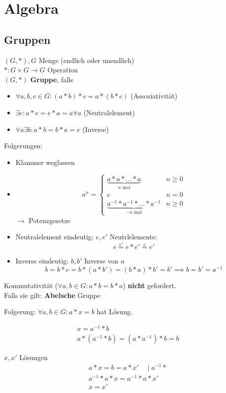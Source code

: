 \chapter{Algebra}
\section{Gruppen}
\clearpage
\begin{def*}[note = Gruppe , index = Gruppe]
	$(G,*) , G$ Menge (endlich oder unendlich) \\
	$* : G \times G \rightarrow G$ Operation \\
	$(G,*)$ \textbf{Gruppe}, falls
	\begin{itemize}
		\item $\forall a , b , c \in G : (a*b)*c = a*(b*c)$ (Assoziativität)
		\item $\exists e : a*e = e*a = a \forall a$ (Neutralelement)
		\item $\forall a \exists b : a*b = b*a = e$ (Inverse)
	\end{itemize}
	Folgerungen:
	\begin{itemize}
		\item Klammer weglassen
		\item \[ a^n = \begin{cases}
			\underbrace{a * a * \dots * a}_{n \text{ mal}}				&n \geq 0	\\
			e											&n = 0	\\
			\underbrace{a^{-1} * a^{-1} * \dots * a^{-1}}_{-n \text{ mal}}	&n \geq 0	
			\end{cases} \] $\rightarrow$ Potenzgesetze
		\item Neutralelement eindeutig: $e, e'$ Neutrlelemente: \[ e \overset{e'}{=} e * e' \overset{e}{=} e' \]
		\item Inverse eindeutig: $b, b'$ Inverse von $a$ \[ b = b*e = b*(a*b') = (b*a)*b' = b' \implies b = b' = a^{-1} \]
	\end{itemize}
\end{def*}
\begin{bem}
	Kommutativität ($\forall a, b \in G : a * b = b * a$) \textbf{nicht} gefordert. \\
	Falls sie gilt: \textbf{Abelsche} Gruppe
\end{bem}
Folgerung:
$\forall a, b \in G : a * x = b$ hat  Lösung. \\
\begin{bew}[note = Exsitenz]
	\begin{gather*}
		x = a^{-1} * b \\
		a * ( a^{-1} * b ) = ( a * a^{-1} ) * b = b
	\end{gather*}
\end{bew}
\begin{bew}[note = Eindeutigkeit]
	$x, x'$ Lösungen \\
	\begin{gather*}
		a * x = b = a * x' \quad \mid a^{-1} * \\
		a^{-1} * a * x = a^{-1} * a * x' \\
		x = x'
	\end{gather*}
\end{bew}

